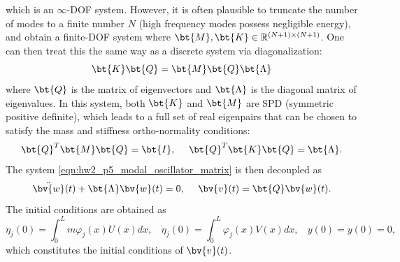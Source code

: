 \begin{enumerate}[(i)]
{\begin{equation}
    \end{equation}
    which is an $\infty$-DOF system. 
    However, it is often plausible to truncate the number of modes to a finite number $N$ (high frequency modes possess negligible energy), and obtain a finite-DOF system where $\bt{M}, \bt{K} \in \mathbb{R}^{(N+1)\times(N+1)}$.
    One can then treat this the same way as a discrete system via diagonalization:
    \begin{equation}
        \bt{K} \bt{Q} = \bt{M} \bt{Q} \bt{\Lambda}
    \end{equation}
    where $\bt{Q}$ is the matrix of eigenvectors and $\bt{\Lambda}$ is the diagonal matrix of eigenvalues. 
    In this system, both $\bt{K}$ and $\bt{M}$ are SPD (symmetric positive definite), which leads to a full set of real eigenpairs that can be chosen to satisfy the mass and stiffness ortho-normality conditions:
    \begin{equation}
        \bt{Q}^T \bt{M} \bt{Q} = \bt{I}, ~~~~ \bt{Q}^T \bt{K} \bt{Q} = \bt{\Lambda}.
    \end{equation}
    The system \cref{eqn:hw2_p5_modal_oscillator_matrix} is then decoupled as 
    \begin{equation}
        \ddot{\bv{w}}(t) + \bt{\Lambda} \bv{w}(t) = 0, ~~~~ \bv{v}(t) = \bt{Q} \bv{w}(t).
    \end{equation}
    The initial conditions are obtained as 
    \begin{equation}
        \eta_j(0) = \int_0^L m \varphi_j(x) U(x) dx, ~~~~ \dot{\eta}_j(0) = \int_0^L \varphi_j(x) V(x) dx, ~~~~ y(0) = \dot{y}(0) = 0,
    \end{equation}
    which constitutes the initial conditions of $\bv{v}(t)$.

}
\end{enumerate}
